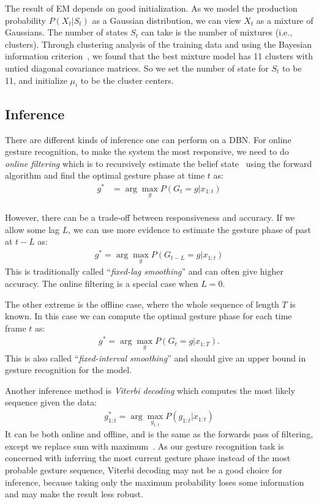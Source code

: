 \documentclass[10pt,twocolumn,letterpaper]{article}
\begin{document}
The result of EM depends on good initialization. As we model the production probability $P(X_t | S_t)$ as a Gaussian distribution, we
can view $X_t$ as a mixture of Gaussians. The number of states $S_t$ can take is the
number of mixtures (i.e., clusters). Through clustering analysis of the training data and
using the Bayesian information criterion~\cite{fraley12}, we found that the best mixture model has 11 clusters
with untied diagonal covariance matrices. So we set the number of state for $S_t$
to be 11, and initialize $\mu_i$ to be the cluster centers. 

\subsection{Inference}
There are different kinds of inference one can perform on a DBN. For online gesture
recognition, to make the system the most responsive, we need to do \textit{online filtering} which is to recursively estimate the
belief state~\cite{murphy02} using the forward algorithm and find the optimal gesture phase
at time $t$ as:
\begin{align*}
g^* &= \arg\max_g P(G_t = g | x_{1:t}) \\
\end{align*}

However, there can be a trade-off between responsiveness and accuracy. If we allow some lag $L$,
we can use more evidence to estimate the gesture phase of past at $t - L$ as:
\begin{align*}
g^* = \arg\max_g P(G_{t - L} = g | x_{1 : t} )
\end{align*}
This is traditionally called ``\textit{fixed-lag smoothing}'' and can often give higher
accuracy. The online filtering is a special case when $L = 0$.

The other extreme is the offline case, where the whole sequence of length $T$ is known. In this case
we can compute the optimal gesture phase for each time frame $t$ as:
\begin{align*}
g^* = \arg\max_g P(G_t = g | x_{1 : T}).
\end{align*}
This is also called ``\textit{fixed-interval smoothing}'' and should give an 
upper bound in gesture recognition for the model.

Another inference method is \textit{Viterbi decoding} which computes the most likely
sequence given the data:
\begin{align*}
g^*_{1:t} = \arg\max_{g_{1:t}}P(g_{1:t} | x_{1:t})
\end{align*}
It can be both online and offline, and is the same as the forwards pass of filtering, 
except we replace sum with maximum~\cite{murphy02}. As our gesture recognition task is
concerned with inferring the most current gesture phase instead of the most probable gesture 
sequence, Viterbi decoding may not be a good choice for inference, because 
taking only the maximum probability loses some information and may make the result 
less robust. 
\end{document}
